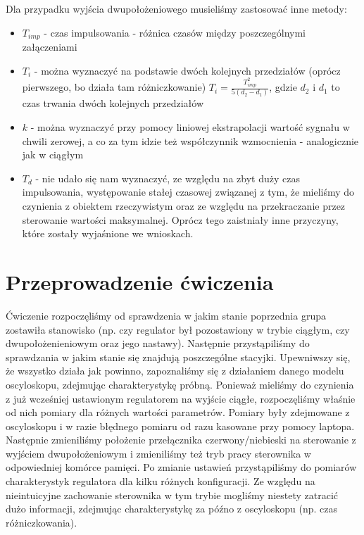 \documentclass[a4paper, 12pt]{article}
\begin{document}
		Dla przypadku wyjścia dwupołożeniowego musieliśmy zastosować inne metody:
		\begin{itemize}
			\item $T_{imp}$ - czas impulsowania - różnica czasów między poszczególnymi załączeniami
			\item $T_i$ - można wyznaczyć na podstawie dwóch kolejnych przedziałów (oprócz pierwszego, bo działa tam różniczkowanie) $T_i = \frac{T^2_{imp}}{5(d_2-d_1)}$, gdzie $d_2$ i $d_1$ to czas trwania dwóch kolejnych przedziałów
			\item $k$ - można wyznaczyć przy pomocy liniowej ekstrapolacji wartość sygnału w chwili zerowej, a co za tym idzie też współczynnik wzmocnienia - analogicznie jak w ciągłym
			\item $T_d$ - nie udało się nam wyznaczyć, ze względu na zbyt duży czas impulsowania, występowanie stałej czasowej związanej z tym, że mieliśmy do czynienia z obiektem rzeczywistym oraz ze względu na przekraczanie przez sterowanie wartości maksymalnej. Oprócz tego zaistniały inne przyczyny, które zostały wyjaśnione we wnioskach.
		\end{itemize}
	\section{Przeprowadzenie ćwiczenia}
		Ćwiczenie rozpoczęliśmy od sprawdzenia w jakim stanie poprzednia grupa zostawiła stanowisko (np. czy regulator był pozostawiony w trybie ciągłym, czy dwupołożenieniowym oraz jego nastawy). Następnie przystąpiliśmy do sprawdzania w jakim stanie się znajdują poszczególne stacyjki. Upewniwszy się, że wszystko działa jak powinno, zapoznaliśmy się z działaniem danego modelu oscyloskopu, zdejmując charakterystykę próbną.
		\newline 
		\newline
		Ponieważ mieliśmy do czynienia z już wcześniej ustawionym regulatorem na wyjście ciągłe, rozpoczęliśmy właśnie od nich pomiary dla różnych wartości parametrów. Pomiary były zdejmowane z oscyloskopu i w razie błędnego pomiaru od razu kasowane przy pomocy laptopa.
		\newline
		\newline
		Następnie zmieniliśmy położenie przełącznika czerwony/niebieski na sterowanie z wyjściem dwupołożeniowym i zmieniliśmy też tryb pracy sterownika w odpowiedniej komórce pamięci. Po zmianie ustawień przystąpiliśmy do pomiarów charakterystyk regulatora dla kilku różnych konfiguracji. Ze względu na nieintuicyjne zachowanie sterownika w tym trybie mogliśmy niestety zatracić dużo informacji, zdejmując charakterystykę za późno z oscyloskopu (np. czas różniczkowania).
\end{document}
